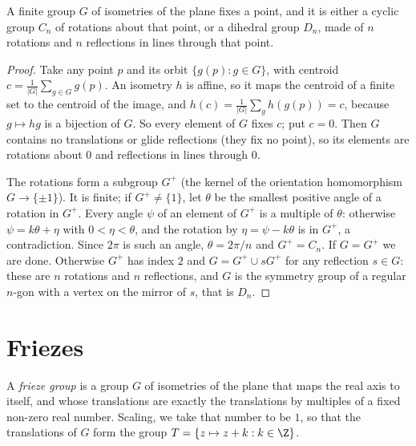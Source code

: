 \begin{theorem}\label{geometry:thm:leonardo}
A finite group $G$ of isometries of the plane fixes a point, and it is either a cyclic group $C_n$ of rotations about that point, or a
dihedral group $D_n$, made of $n$ rotations and $n$ reflections in lines through that point.
\end{theorem}
\begin{proof}
Take any point $p$ and its orbit $\{g(p):g\in G\}$, with centroid $c=\frac1{|G|}\sum_{g\in G}g(p)$. An isometry $h$ is affine, so it maps
the centroid of a finite set to the centroid of the image, and $h(c)=\frac1{|G|}\sum_gh(g(p))=c$, because $g\mapsto hg$ is a bijection of $G$.
So every element of $G$ fixes $c$; put $c=0$. Then $G$ contains no translations or glide reflections (they fix no point), so its elements
are rotations about $0$ and reflections in lines through $0$.

The rotations form a subgroup $G^+$ (the kernel of the orientation homomorphism $G\to\{\pm1\}$). It is finite; if $G^+\ne\{1\}$, let $\theta$
be the smallest positive angle of a rotation in $G^+$. Every angle $\psi$ of an element of $G^+$ is a multiple of $\theta$: otherwise
$\psi=k\theta+\eta$ with $0<\eta<\theta$, and the rotation by $\eta=\psi-k\theta$ is in $G^+$, a contradiction. Since $2\pi$ is such an
angle, $\theta=2\pi/n$ and $G^+=C_n$. If $G=G^+$ we are done. Otherwise $G^+$ has index $2$ and $G=G^+\cup sG^+$ for any reflection
$s\in G$: these are $n$ rotations and $n$ reflections, and $G$ is the symmetry group of a regular $n$-gon with a vertex on the mirror of $s$,
that is $D_n$.
\end{proof}

\section{Friezes}

\begin{definition}\label{geometry:def:frieze}
A \emph{frieze group} is a group $G$ of isometries of the plane that maps the real axis to itself, and whose translations are exactly the
translations by multiples of a fixed non-zero real number. Scaling, we take that number to be $1$, so that the translations of $G$ form
the group $T=\{z\mapsto z+k:k\in\Z\}$.
\end{definition}

